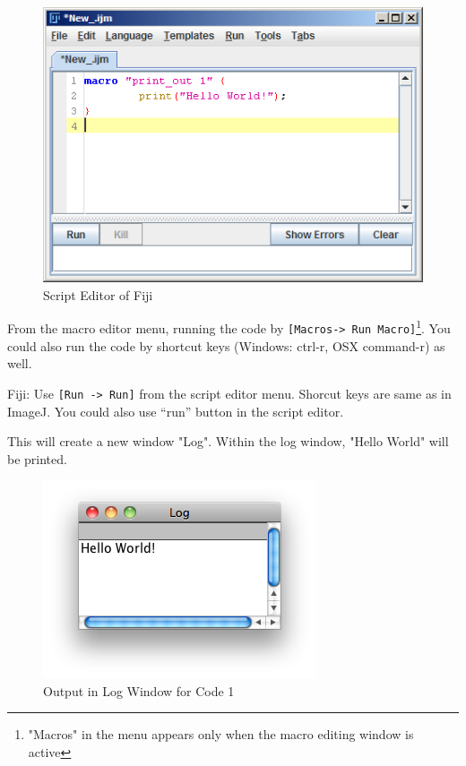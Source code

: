 \documentclass[11pt,a4paper,oneside]{report}
\newenvironment{indentFiji}%
{\begin{list}{}%
         {\setlength{\leftmargin}{1em}}%
         \item[]%
}
{\end{list}}
\newcommand{\ijmenu}[1]{\texttt{\small#1}}
\begin{document}
\begin{figure}[htbp]
\begin{center}
\includegraphics[scale=0.6]{fig/editor_helloworld_fiji.png}
\caption{Script Editor of Fiji} \label{fig_ScriptEditor}
\end{center}
\end{figure}

From the macro editor menu, running the code by \ijmenu{[Macros->
Run Macro]}\footnote{"Macros" in the menu appears only when the macro editing
window is active}. You could also run the code by shortcut keys (Windows:
ctrl-r, OSX command-r) as well. 
 
\begin{indentFiji}
Fiji:  Use \ijmenu{[Run -> Run]} from the script editor menu. Shorcut keys are
same as in ImageJ. You could also use ``run'' button in the script editor. 
\end{indentFiji}
This will create a new window "Log". Within the log window, "Hello World" will
be printed.

\begin{figure}[htbp]
\begin{center}
\includegraphics[scale=0.6]{fig/Log_HelloWorld.png}
\caption{Output in Log Window for Code 1} \label{fig23-1}
\end{center}
\end{figure}
\end{document}
